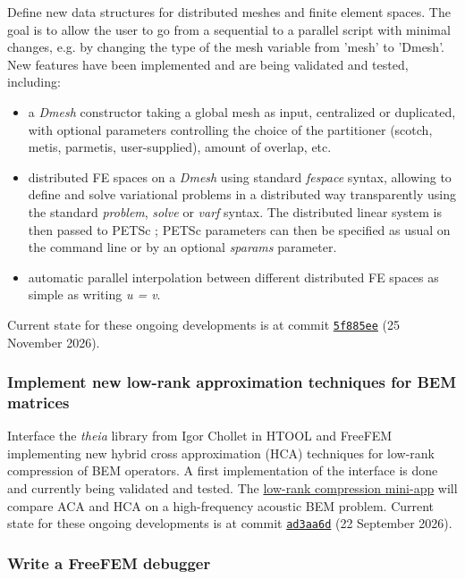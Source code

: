 Define new data structures for distributed meshes and finite element spaces. The goal is to allow the user to go from a sequential to a parallel script with minimal changes, e.g. by changing the type of the mesh variable from 'mesh' to 'Dmesh'. New features have been implemented and are being validated and tested, including:
\begin{itemize}
\item a \textit{Dmesh} constructor taking a global mesh as input, centralized or duplicated, with optional parameters controlling the choice of the partitioner (scotch, metis, parmetis, user-supplied), amount of overlap, etc.
\item distributed FE spaces on a \textit{Dmesh} using standard \textit{fespace} syntax, allowing to define and solve variational problems in a distributed way transparently using the standard \textit{problem}, \textit{solve} or \textit{varf} syntax. The distributed linear system is then passed to PETSc ; PETSc parameters can then be specified as usual on the command line or by an optional \textit{sparams} parameter.
\item automatic parallel interpolation between different distributed FE spaces as simple as writing \textit{u = v}.
\end{itemize}

Current state for these ongoing developments is at commit \href{https://github.com/FreeFem/FreeFem-sources/commit/5f885eefd49a9375c0fdf431b215e4c6b8e964d7}{\texttt{5f885ee}} (25 November 2026).

\subsubsection{Implement new low-rank approximation techniques for BEM matrices}
\label{sec:Freefem++:implementation-2026:lowrank}

Interface the \textit{theia} library from Igor Chollet in HTOOL and FreeFEM implementing new hybrid cross approximation (HCA) techniques for low-rank compression of BEM operators. 
A first implementation of the interface is done and currently being validated and tested.
The \hyperref[sec:app:specs:app-freefem-lowrank]{low-rank compression mini-app} will compare ACA and HCA on a high-frequency acoustic BEM problem.
Current state for these ongoing developments is at commit \href{https://github.com/FreeFem/FreeFem-sources/commit/ad3aa6d0b207c3725e46f82a45fbbcebc217dfdd}{\texttt{ad3aa6d}} (22 September 2026).

\subsubsection{Write a FreeFEM debugger}
\label{sec:Freefem++:implementation-2026:debugger}

